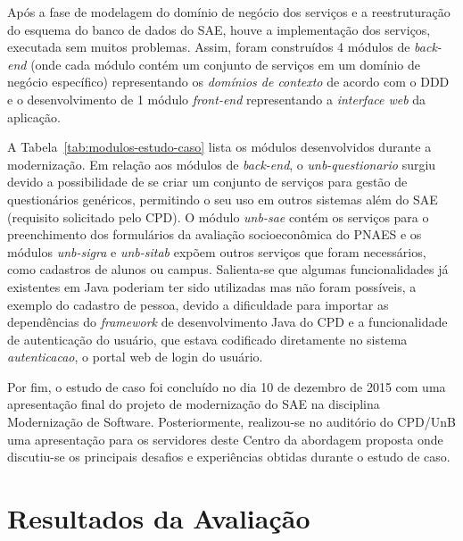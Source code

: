 Após a fase de modelagem do domínio de negócio dos serviços e 
a reestruturação do esquema do banco de dados do \acrshort{SAE}, 
houve a implementação dos serviços, executada sem muitos
problemas. Assim, foram
construídos 4 módulos de \textit{back-end} 
(onde cada módulo contém 
um conjunto de serviços em um domínio de negócio específico)
representando os \emph{domínios de contexto} de acordo com o \acrshort{DDD} 
e o desenvolvimento de
1 módulo \textit{front-end} representando a \emph{interface web}
da aplicação. 

A Tabela~\ref{tab:modulos-estudo-caso} lista os módulos desenvolvidos durante 
a modernização. Em relação aos módulos de \textit{back-end},
o \emph{unb-questionario} 
surgiu devido a possibilidade de se criar um conjunto de serviços para
gestão de questionários genéricos, permitindo o seu uso em outros sistemas
além do \acrshort{SAE} (requisito solicitado pelo CPD). O módulo
\emph{unb-sae} contém os serviços para o preenchimento dos formulários 
da avaliação socioeconômica do \acrshort{PNAES} e os
módulos \emph{unb-sigra} e \emph{unb-sitab} expõem outros
serviços que foram necessários, como cadastros de alunos
ou campus. Salienta-se que algumas funcionalidades já existentes
em Java poderiam ter sido utilizadas mas não foram possíveis, a exemplo
do cadastro de pessoa, devido
a dificuldade para importar as dependências do 
\textit{framework} de desenvolvimento Java do CPD e
a funcionalidade de autenticação do usuário, que estava
codificado diretamente no sistema \emph{autenticacao}, o portal 
web de login do usuário.




Por fim, o estudo de caso foi concluído no dia 10 de
dezembro de 2015 com uma apresentação final do projeto 
de modernização do \acrshort{SAE} na disciplina Modernização de Software. 
Posteriormente, realizou-se no auditório 
do CPD/UnB uma apresentação para os servidores deste
Centro da abordagem proposta onde discutiu-se
os principais desafios e
experiências obtidas durante o estudo de caso.







\section{Resultados da Avaliação}\label{ava:resultados}

